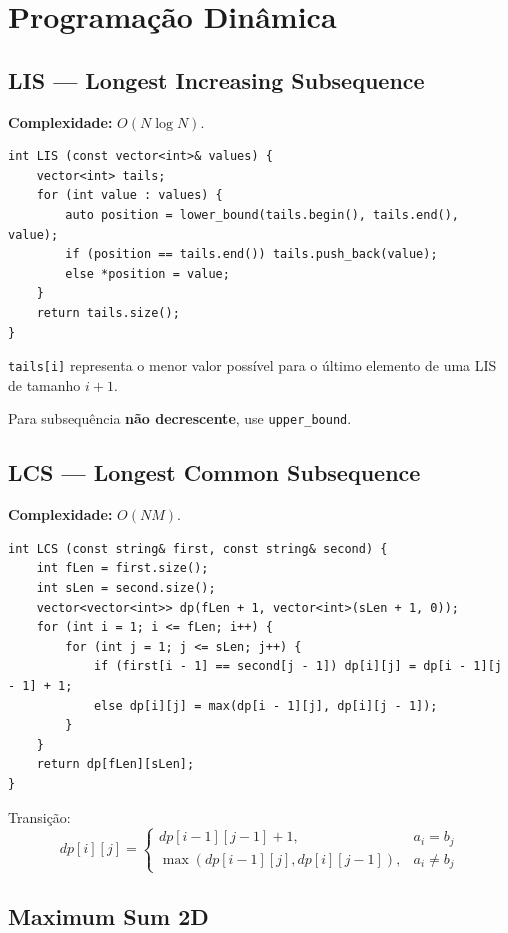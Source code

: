\section{Programação Dinâmica}



\subsection{LIS --- Longest Increasing Subsequence}

\textbf{Complexidade:} $O(N\log N)$.

\begin{lstlisting}
int LIS (const vector<int>& values) {
    vector<int> tails;
    for (int value : values) {
        auto position = lower_bound(tails.begin(), tails.end(), value);
        if (position == tails.end()) tails.push_back(value);
        else *position = value;
    }
    return tails.size();
}
\end{lstlisting}

\texttt{tails[i]} representa o menor valor possível para o
último elemento de uma LIS de tamanho $i+1$.

Para subsequência \textbf{não decrescente}, use \texttt{upper\_bound}.


\subsection{LCS --- Longest Common Subsequence}

\textbf{Complexidade:} $O(NM)$.

\begin{lstlisting}
int LCS (const string& first, const string& second) {
    int fLen = first.size();
    int sLen = second.size();
    vector<vector<int>> dp(fLen + 1, vector<int>(sLen + 1, 0));
    for (int i = 1; i <= fLen; i++) {
        for (int j = 1; j <= sLen; j++) {
            if (first[i - 1] == second[j - 1]) dp[i][j] = dp[i - 1][j - 1] + 1;
            else dp[i][j] = max(dp[i - 1][j], dp[i][j - 1]);
        }
    }
    return dp[fLen][sLen];
}
\end{lstlisting}

Transição:
\[
dp[i][j] =
\begin{cases}
dp[i-1][j-1] + 1,
& a_i=b_j \\[4pt]
\max(dp[i-1][j],dp[i][j-1]),
& a_i\neq b_j
\end{cases}
\]


\subsection{Maximum Sum 2D}

